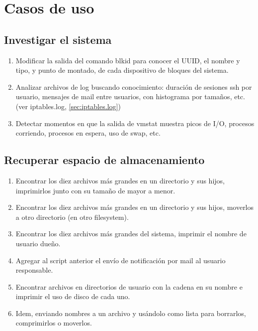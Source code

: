 \section{Casos de uso}


\subsection{Investigar el sistema}
\begin{enumerate}
	\item 
Modificar la salida del comando blkid para conocer el UUID, el nombre y tipo, y punto de montado, de cada dispositivo de bloques del sistema.
	\item 
Analizar archivos de log buscando conocimiento: duración de sesiones ssh por usuario, mensajes de mail entre usuarios, con histograma por tamaños, etc. (ver iptables.log, \ref{sec:iptables.log})
	\item 
Detectar momentos en que la salida de vmstat muestra picos de I/O, procesos corriendo, procesos en espera, uso de swap, etc.
\end{enumerate}


\subsection{Recuperar espacio de almacenamiento}
\begin{enumerate}
	\item Encontrar los diez archivos más grandes en un directorio y sus hijos, imprimirlos junto con su tamaño de mayor a menor.
	\item Encontrar los diez archivos más grandes en un directorio y sus hijos, moverlos a otro directorio (en otro filesystem).
	\item Encontrar los diez archivos más grandes del sistema, imprimir el nombre de usuario dueño.
	\item Agregar al script anterior el envío de notificación por mail al usuario responsable.
		\item 
Encontrar archivos en directorios de usuario con la cadena  en su nombre e imprimir el uso de disco de cada uno.
	\item 
Idem, enviando nombres a un archivo y usándolo como lista para borrarlos, comprimirlos o moverlos.

\end{enumerate}



